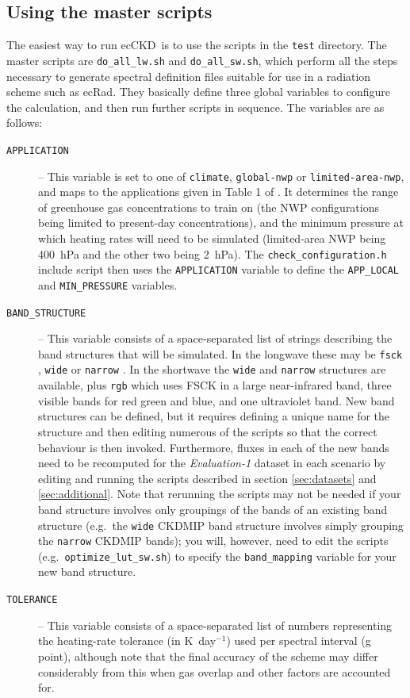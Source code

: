 \documentclass[a4,oneside]{article}
\def\codesize{\small}
\newcommand{\ecckd}{ecCKD}
\def\codesize{\small}
\def\code#1{{\codesize\texttt{#1}}}
\begin{document}
\subsection{Using the master scripts}
\label{sec:master}
The easiest way to run \ecckd\ is to use the scripts in the
\code{test} directory. The master scripts are \code{do\_all\_lw.sh}
and \code{do\_all\_sw.sh}, which perform all the steps necessary to
generate spectral definition files suitable for use in a radiation
scheme such as ecRad. They basically define three global variables to
configure the calculation, and then run further scripts in
sequence. The variables are as follows:
\begin{description}
\item[\code{APPLICATION}] -- This variable is set to one of
  \code{climate}, \code{global-nwp} or \code{limited-area-nwp}, and
  maps to the applications given in Table 1 of \cite{Hogan&2020}. It
  determines the range of greenhouse gas concentrations to train on
  (the NWP configurations being limited to present-day
  concentrations), and the minimum pressure at which heating rates
  will need to be simulated (limited-area NWP being 400~hPa and the
  other two being 2~hPa). The \code{check\_configuration.h} include
  script then uses the \code{APPLICATION} variable to define the
  \code{APP\_LOCAL} and \code{MIN\_PRESSURE} variables.
\item[\code{BAND\_STRUCTURE}] -- This variable consists of a
  space-separated list of strings describing the band structures that
  will be simulated.  In the longwave these may be \code{fsck}
  \citep[the full-spectrum correlated-$k$ method, FSCK, described
    by][]{Hogan2010}, \code{wide} or \code{narrow} \citep[the band
    structures proposed by][]{Hogan&2020}. In the shortwave the
  \code{wide} and \code{narrow} structures are available, plus
  \code{rgb} which uses FSCK in a large near-infrared band, three
  visible bands for red green and blue, and one ultraviolet band.  New
  band structures can be defined, but it requires defining a unique
  name for the structure and then editing numerous of the scripts so
  that the correct behaviour is then invoked. Furthermore, fluxes in
  each of the new bands need to be recomputed for the
  \emph{Evaluation-1} dataset in each scenario by editing and running
  the scripts described in section \ref{sec:datasets} and
  \ref{sec:additional}. Note that rerunning the scripts may not be
  needed if your band structure involves only groupings of the bands
  of an existing band structure (e.g.\ the \code{wide} CKDMIP band
  structure involves simply grouping the \code{narrow} CKDMIP bands);
  you will, however, need to edit the scripts
  (e.g.\ \code{optimize\_lut\_sw.sh}) to specify the
  \code{band\_mapping} variable for your new band structure.
\item[\code{TOLERANCE}] -- This variable consists of a space-separated
  list of numbers representing the heating-rate tolerance (in
  K~day$^{-1}$) used per spectral interval (g point), although note
  that the final accuracy of the scheme may differ considerably from
  this when gas overlap and other factors are accounted for.
\end{description}
\end{document}
